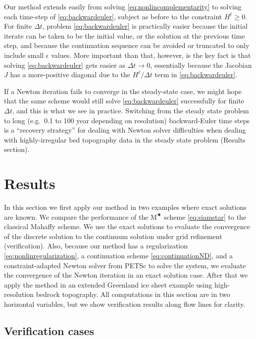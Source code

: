 \documentclass[twocolumn,letterpaper]{igs}
\newcommand\eps{\epsilon}
\newcommand{\Mstar}{$\text{M}^{\bigstar}$\xspace}
\begin{document}
Our method extends easily from solving \eqref{eq:nonlincomplementarity} to solving each time-step of \eqref{eq:backwardeuler}, subject as before to the constraint $H^\ell\ge 0$.  For finite $\Delta t$, problem \eqref{eq:backwardeuler} is practically easier because the initial iterate can be taken to be the initial value, or the solution at the previous time step, and because the continuation sequence can be avoided or truncated to only include small $\eps$ values.  More important than that, however, is the key fact is that solving \eqref{eq:backwardeuler} gets easier as $\Delta t\to 0$, essentially because the Jacobian $J$ has a more-positive diagonal due to the $H^\ell/\Delta t$ term in \eqref{eq:backwardeuler}.

If a Newton iteration fails to converge in the steady-state case, we might hope that the same scheme would still solve \eqref{eq:backwardeuler} successfully for finite $\Delta t$, and this is what we see in practice.  Switching from the steady state problem to long (e.g.~0.1 to 100 year depending on resolution) backward-Euler time steps is a ``recovery strategy'' for dealing with Newton solver difficulties when dealing with highly-irregular bed topography data in the steady state problem (Results section).


\section{Results}

In this section we first apply our method in two examples where exact solutions are known.  We compare the performance of the \Mstar scheme \eqref{eq:siamstar} to the classical Mahaffy scheme.  We use the exact solutions to evaluate the convergence of the discrete solution to the continuum solution under grid refinement (verification).  Also, because our method has a regularization \eqref{eq:nonlinregularization}, a continuation scheme \eqref{eq:continuationND}, and a constraint-adapted Newton solver from PETSc to solve the system, we evaluate the convergence of the Newton iteration in an exact solution case.  After that we apply the method in an extended Greenland ice sheet example using high-resolution bedrock topography.  All computations in this section are in two horizontal variables, but we show verification results along flow lines for clarity.

\subsection{Verification cases}
\end{document}
